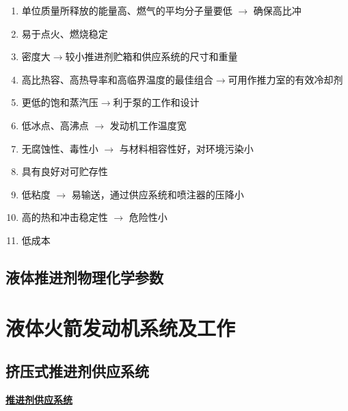 \sssection[选择推进剂的原则]
\vspace*{-0.8em}
\begin{enumerate}[\hspace*{1.5em} (1)  ]
	\item 单位质量所释放的能量高、燃气的平均分子量要低 $\longrightarrow$ 确保高比冲\vspace*{-0.5em}
	\item 易于点火、燃烧稳定\vspace*{-0.5em}
	\item 密度大$\longrightarrow$较小推进剂贮箱和供应系统的尺寸和重量\vspace*{-0.5em}
	\item 高比热容、高热导率和高临界温度的最佳组合$\longrightarrow$可用作推力室的有效冷却剂\vspace*{-0.5em}
	\item 更低的饱和蒸汽压$\longrightarrow$利于泵的工作和设计\vspace*{-0.5em}
	\item 低冰点、高沸点 $\longrightarrow$ 发动机工作温度宽\vspace*{-0.5em}
	\item 无腐蚀性、毒性小 $\longrightarrow$ 与材料相容性好，对环境污染小\vspace*{-0.5em}
	\item 具有良好对可贮存性\vspace*{-0.5em}
	\item 低粘度 $\longrightarrow$ 易输送，通过供应系统和喷注器的压降小\vspace*{-0.5em}
	\item 高的热和冲击稳定性 $\longrightarrow$ 危险性小\vspace*{-0.5em}
	\item 低成本
\end{enumerate}
\vspace*{0.5em}

\subsection{液体推进剂物理化学参数}


\section{液体火箭发动机系统及工作}
\subsection{挤压式推进剂供应系统}
\noindent \textbf{\underline{推进剂供应系统}}

